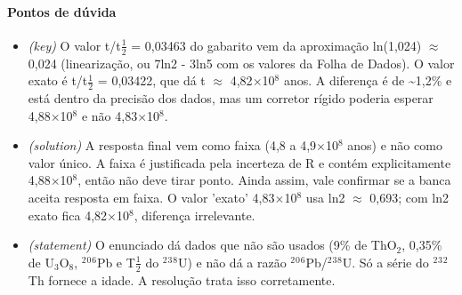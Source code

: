 \documentclass{article}%
\begin{document}
\paragraph{Pontos de dúvida}%
\begin{itemize}%
\item%
\textit{(key)} O valor t/t$\frac12$ = 0,03463 do gabarito vem da aproximação ln(1,024) $\approx$ 0,024 (linearização, ou 7ln2 - 3ln5 com os valores da Folha de Dados). O valor exato é t/t$\frac12$ = 0,03422, que dá t $\approx$ 4,82$\times$10$^{8}$ anos. A diferença é de \textasciitilde{}1,2\% e está dentro da precisão dos dados, mas um corretor rígido poderia esperar 4,88$\times$10$^{8}$ e não 4,83$\times$10$^{8}$.%
\item%
\textit{(solution)} A resposta final vem como faixa (4,8 a 4,9$\times$10$^{8}$ anos) e não como valor único. A faixa é justificada pela incerteza de R e contém explicitamente 4,88$\times$10$^{8}$, então não deve tirar ponto. Ainda assim, vale confirmar se a banca aceita resposta em faixa. O valor 'exato' 4,83$\times$10$^{8}$ usa ln2 $\approx$ 0,693; com ln2 exato fica 4,82$\times$10$^{8}$, diferença irrelevante.%
\item%
\textit{(statement)} O enunciado dá dados que não são usados (9\% de ThO$_{2}$, 0,35\% de U$_{3}$O$_{8}$, $^2$$^{0}$$^{6}$Pb e T$\frac12$ do $^2$$^3$$^{8}$U) e não dá a razão $^2$$^{0}$$^{6}$Pb/$^2$$^3$$^{8}$U. Só a série do $^2$$^3$$^2$Th fornece a idade. A resolução trata isso corretamente.%
\end{itemize}%
\end{document}
